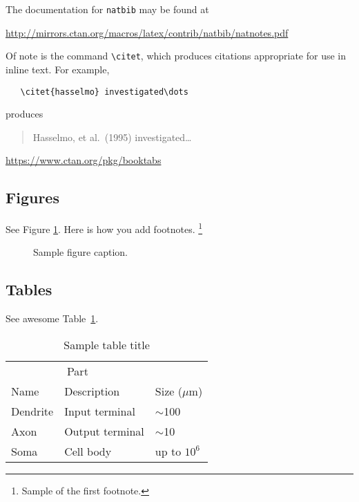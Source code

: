 \documentclass{article}
\begin{document}
The documentation for \verb+natbib+ may be found at
\begin{center}
  \url{http://mirrors.ctan.org/macros/latex/contrib/natbib/natnotes.pdf}
\end{center}
Of note is the command \verb+\citet+, which produces citations
appropriate for use in inline text.  For example,
\begin{verbatim}
   \citet{hasselmo} investigated\dots
\end{verbatim}
produces
\begin{quote}
  Hasselmo, et al.\ (1995) investigated\dots
\end{quote}

\begin{center}
  \url{https://www.ctan.org/pkg/booktabs}
\end{center}


\subsection{Figures}
\lipsum[10] 
See Figure \ref{fig:fig1}. Here is how you add footnotes. \footnote{Sample of the first footnote.}
\lipsum[11] 

\begin{figure}
  \centering
  \fbox{\rule[-.5cm]{4cm}{4cm} \rule[-.5cm]{4cm}{0cm}}
  \caption{Sample figure caption.}
  \label{fig:fig1}
\end{figure}

\subsection{Tables}
\lipsum[12]
See awesome Table~\ref{tab:table}.

\begin{table}
 \caption{Sample table title}
  \centering
  \begin{tabular}{lll}
    \toprule
    \multicolumn{2}{c}{Part}                   \\
    \cmidrule(r){1-2}
    Name     & Description     & Size ($\mu$m) \\
    \midrule
    Dendrite & Input terminal  & $\sim$100     \\
    Axon     & Output terminal & $\sim$10      \\
    Soma     & Cell body       & up to $10^6$  \\
    \bottomrule
  \end{tabular}
  \label{tab:table}
\end{table}
\end{document}

